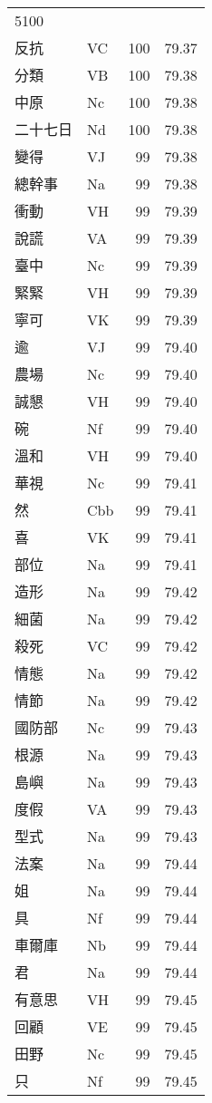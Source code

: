 \documentclass[twocolumn]{book}
\begin{document}
\begin{supertabular}{llrr}
5100\\
反抗 & VC & 100 &  79.37\\
分類 & VB & 100 &  79.38\\
中原 & Nc & 100 &  79.38\\
二十七日 & Nd & 100 &  79.38\\
變得 & VJ & 99 &  79.38\\
總幹事 & Na & 99 &  79.38\\
衝動 & VH & 99 &  79.39\\
說謊 & VA & 99 &  79.39\\
臺中 & Nc & 99 &  79.39\\
緊緊 & VH & 99 &  79.39\\
寧可 & VK & 99 &  79.39\\
逾 & VJ & 99 &  79.40\\
農場 & Nc & 99 &  79.40\\
誠懇 & VH & 99 &  79.40\\
碗 & Nf & 99 &  79.40\\
溫和 & VH & 99 &  79.40\\
華視 & Nc & 99 &  79.41\\
然 & Cbb & 99 &  79.41\\
喜 & VK & 99 &  79.41\\
部位 & Na & 99 &  79.41\\
造形 & Na & 99 &  79.42\\
細菌 & Na & 99 &  79.42\\
殺死 & VC & 99 &  79.42\\
情態 & Na & 99 &  79.42\\
情節 & Na & 99 &  79.42\\
國防部 & Nc & 99 &  79.43\\
根源 & Na & 99 &  79.43\\
島嶼 & Na & 99 &  79.43\\
度假 & VA & 99 &  79.43\\
型式 & Na & 99 &  79.43\\
法案 & Na & 99 &  79.44\\
姐 & Na & 99 &  79.44\\
具 & Nf & 99 &  79.44\\
車爾庫 & Nb & 99 &  79.44\\
君 & Na & 99 &  79.44\\
有意思 & VH & 99 &  79.45\\
回顧 & VE & 99 &  79.45\\
田野 & Nc & 99 &  79.45\\
只 & Nf & 99 &  79.45\\

\end{supertabular}
\end{document}
